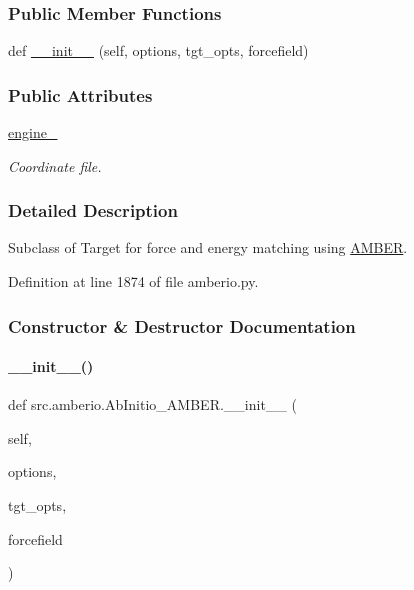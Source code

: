 \subsubsection*{Public Member Functions}
\begin{DoxyCompactItemize}
\item 
def \hyperlink{classsrc_1_1amberio_1_1AbInitio__AMBER_a3d86adb9aecf4ceae03edc43580f6639}{\+\_\+\+\_\+init\+\_\+\+\_\+} (self, options, tgt\+\_\+opts, forcefield)
\end{DoxyCompactItemize}
\subsubsection*{Public Attributes}
\begin{DoxyCompactItemize}
\item 
\hyperlink{classsrc_1_1amberio_1_1AbInitio__AMBER_acbc3213affce41994ad6bdb7453fc02f}{engine\+\_\+}
\begin{DoxyCompactList}\small\item\em Coordinate file. \end{DoxyCompactList}\end{DoxyCompactItemize}


\subsubsection{Detailed Description}
Subclass of Target for force and energy matching using \hyperlink{classsrc_1_1amberio_1_1AMBER}{A\+M\+B\+ER}. 



Definition at line 1874 of file amberio.\+py.



\subsubsection{Constructor \& Destructor Documentation}
\mbox{\label{classsrc_1_1amberio_1_1AbInitio__AMBER_a3d86adb9aecf4ceae03edc43580f6639}} 
\paragraph{\texorpdfstring{\+\_\+\+\_\+init\+\_\+\+\_\+()}{\_\_init\_\_()}}
{\footnotesize\ttfamily def src.\+amberio.\+Ab\+Initio\+\_\+\+A\+M\+B\+E\+R.\+\_\+\+\_\+init\+\_\+\+\_\+ (\begin{DoxyParamCaption}\item[{}]{self,  }\item[{}]{options,  }\item[{}]{tgt\+\_\+opts,  }\item[{}]{forcefield }\end{DoxyParamCaption})}



